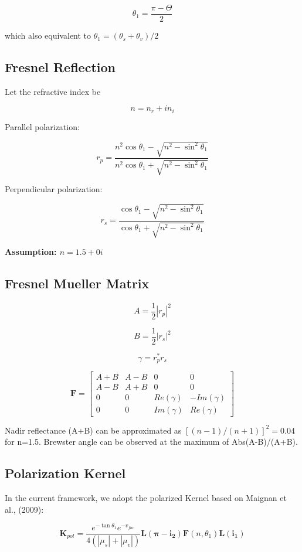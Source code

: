 \documentclass[
  11pt,
  letterpaper,
  DIV=11,
  numbers=noendperiod]{scrreprt}
\begin{document}
\[
\theta_1 =\frac{\pi - \Theta}{2}
\]

which also equivalent to \(\theta_1=(\theta_s+\theta_v)/2\)

\subsection{Fresnel Reflection}\label{fresnel-reflection}

Let the refractive index be

\[
n = n_r + i n_i
\]

Parallel polarization:

\[
r_p =
\frac{n^2\cos\theta_1 - \sqrt{n^2-\sin^2\theta_1}}
{n^2\cos\theta_1 + \sqrt{n^2-\sin^2\theta_1}}
\]

Perpendicular polarization:

\[
r_s =
\frac{\cos\theta_1 - \sqrt{n^2-\sin^2\theta_1}}
{\cos\theta_1 + \sqrt{n^2-\sin^2\theta_1}}
\]

\textbf{Assumption: \(n = 1.5 + 0i\) }

\subsection{Fresnel Mueller Matrix}\label{fresnel-mueller-matrix}

\[
A = \frac{1}{2}|r_p|^2
\]

\[
B = \frac{1}{2}|r_s|^2
\]

\[
\gamma = r_p^* r_s
\]

\[
\mathbf{F} =
\begin{bmatrix}
A+B & A-B & 0 & 0 \\
A-B & A+B & 0 & 0 \\
0 & 0 & Re(\gamma) & -Im(\gamma) \\
0 & 0 & Im(\gamma) & Re(\gamma)
\end{bmatrix}
\]

Nadir reflectance (A+B) can be approximated as \([(n-1)/(n+1)]^2=0.04\)
for n=1.5. Brewster angle can be observed at the maximum of
Abs(A-B)/(A+B).

\subsection{Polarization Kernel}\label{polarization-kernel}

In the current framework, we adopt the polarized Kernel based on Maignan
et al., (2009):

\[
\mathbf{K}_{pol} =
\frac{
e^{-\tan\theta_1}e^{-v_{fac}}
}{4(|\mu_s|+|\mu_v|)}
\mathbf{L(\pi-i_2)}\mathbf{F} (n, \theta_1) \mathbf{L(i_1)}
\]
\end{document}
